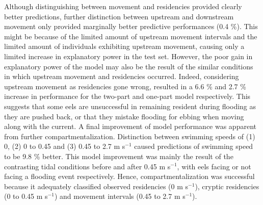 \documentclass[preprint,12pt,authoryear]{elsarticle}
\begin{document}
Although distinguishing between movement and residencies provided clearly better predictions, further distinction between upstream and downstream movement only provided marginally better predictive performances (0.4 \%). This might be because of the limited amount of upstream movement intervals and the limited amount of individuals exhibiting upstream movement, causing only a limited increase in explanatory power in the test set. However, the poor gain in explanatory power of the model may also be the result of the similar conditions in which upstream movement and residencies occurred. Indeed, considering upstream movement as residencies gone wrong, resulted in a 6.6 \% and 2.7 \% increase in performance for the two-part and one-part model respectively. This suggests that some eels are unsuccessful in remaining resident during flooding as they are pushed back, or that they mistake flooding for ebbing when moving along with the current. A final improvement of model performance was apparent from further compartmentalization. Distinction between swimming speeds of (1) 0, (2) 0 to 0.45 and (3) 0.45 to 2.7 m s$^{-1}$ caused predictions of swimming speed to be 9.8 \% better. This model improvement was mainly the result of the contrasting tidal conditions before and after 0.45 m s$^{-1}$, with eels facing or not facing a flooding event respectively. Hence, compartmentalization was successful because it adequately classified observed residencies (0 m s$^{-1}$), cryptic residencies (0 to 0.45 m s$^{-1}$) and movement intervals (0.45 to 2.7 m s$^{-1}$). 
\end{document}

